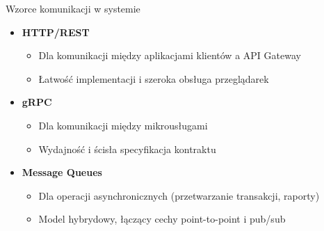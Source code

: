 \documentclass[aspectratio=169]{beamer}
\begin{document}
\begin{frame}{Wzorce komunikacji w systemie}
    \begin{itemize}
        \item \textbf{HTTP/REST}
        \begin{itemize}
            \item Dla komunikacji między aplikacjami klientów a API Gateway
            \item Łatwość implementacji i szeroka obsługa przeglądarek
        \end{itemize}
        \vspace{0.3cm}
        \item \textbf{gRPC}
        \begin{itemize}
            \item Dla komunikacji między mikrousługami
            \item Wydajność i ścisła specyfikacja kontraktu
        \end{itemize}
        \vspace{0.3cm}
        \item \textbf{Message Queues}
        \begin{itemize}
            \item Dla operacji asynchronicznych (przetwarzanie transakcji, raporty)
            \item Model hybrydowy, łączący cechy point-to-point i pub/sub
        \end{itemize}
    \end{itemize}
\end{frame}
\end{document}
